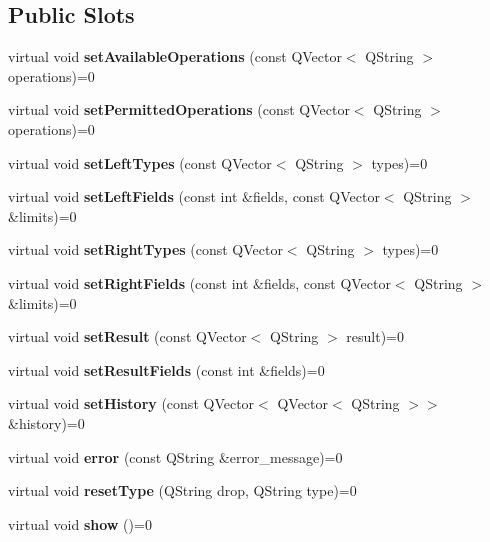 \subsection*{Public Slots}
\begin{DoxyCompactItemize}
\item 
\mbox{\label{class_view_a203ab36b8546f1d9dc630bd7c0536e67}} 
virtual void {\bfseries set\+Available\+Operations} (const Q\+Vector$<$ Q\+String $>$ operations)=0
\item 
\mbox{\label{class_view_a5b3c08e11f2aece6c28c9b36e41ae35a}} 
virtual void {\bfseries set\+Permitted\+Operations} (const Q\+Vector$<$ Q\+String $>$ operations)=0
\item 
\mbox{\label{class_view_a80c90f9167a8bc834d8c2f25be9e5f0d}} 
virtual void {\bfseries set\+Left\+Types} (const Q\+Vector$<$ Q\+String $>$ types)=0
\item 
\mbox{\label{class_view_a497493954a4a2be8cf50306a884d7358}} 
virtual void {\bfseries set\+Left\+Fields} (const int \&fields, const Q\+Vector$<$ Q\+String $>$ \&limits)=0
\item 
\mbox{\label{class_view_a26bb1996d32f29476ba3c0b5c01561fc}} 
virtual void {\bfseries set\+Right\+Types} (const Q\+Vector$<$ Q\+String $>$ types)=0
\item 
\mbox{\label{class_view_a342210db03ff75bfe4b66f3383e50341}} 
virtual void {\bfseries set\+Right\+Fields} (const int \&fields, const Q\+Vector$<$ Q\+String $>$ \&limits)=0
\item 
\mbox{\label{class_view_a2d78db2bd23a6dd80bfeae64f4c3fdd3}} 
virtual void {\bfseries set\+Result} (const Q\+Vector$<$ Q\+String $>$ result)=0
\item 
\mbox{\label{class_view_ad3f5b700bd33a72bebc6efdbad2d17eb}} 
virtual void {\bfseries set\+Result\+Fields} (const int \&fields)=0
\item 
\mbox{\label{class_view_a3d017128dbceb8a10e0c35fcd852e987}} 
virtual void {\bfseries set\+History} (const Q\+Vector$<$ Q\+Vector$<$ Q\+String $>$$>$ \&history)=0
\item 
\mbox{\label{class_view_a117a5d1b3b3e3823e628d859f6f3cb48}} 
virtual void {\bfseries error} (const Q\+String \&error\+\_\+message)=0
\item 
\mbox{\label{class_view_a0fd83f152fae6bbcaf6537f4379fd15b}} 
virtual void {\bfseries reset\+Type} (Q\+String drop, Q\+String type)=0
\item 
\mbox{\label{class_view_a913b840fc8042436555b89878feacb76}} 
virtual void {\bfseries show} ()=0
\end{DoxyCompactItemize}
